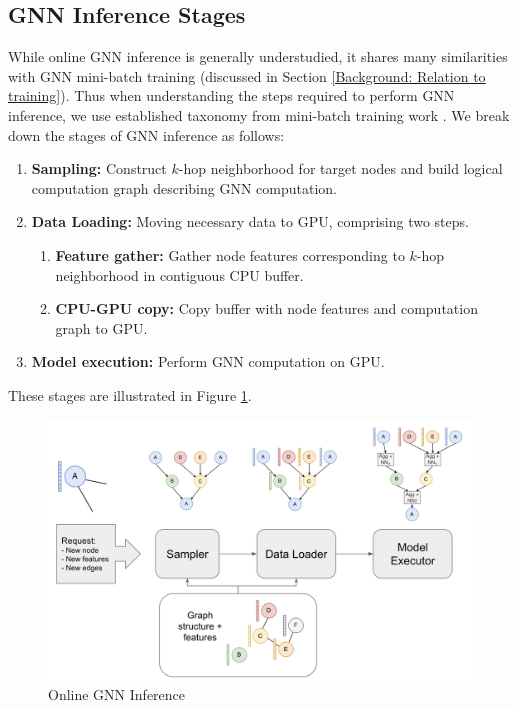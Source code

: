 \subsection{GNN Inference Stages}
While online GNN inference is generally understudied, it shares many similarities with GNN mini-batch training (discussed in Section \ref{Background: Relation to training}). Thus when understanding the steps required to perform GNN inference, we use established taxonomy from mini-batch training work \cite{PaGraph_2020}\cite{GNNLab_2022}\cite{P3_2021}. We break down the stages of GNN inference as follows:

\begin{enumerate}
    \item \textbf{Sampling:} Construct $k$-hop neighborhood for target nodes and build logical computation graph describing GNN computation.
    \item \textbf{Data Loading:} Moving necessary data to GPU, comprising two steps.
    \begin{enumerate}
        \item \textbf{Feature gather:} Gather node features corresponding to $k$-hop neighborhood in contiguous CPU buffer.
        \item \textbf{CPU-GPU copy:} Copy buffer with node features and computation graph to GPU.
    \end{enumerate}
    \item \textbf{Model execution:} Perform GNN computation on GPU.
\end{enumerate}
These stages are illustrated in Figure \ref{Compute Visualization}.

\begin{figure}[h!!!]
    \centering
    \includegraphics[width=\textwidth]{figures/Compute example.png}
    
    \caption{Online GNN Inference}
    \label{Compute Visualization}
\end{figure}    


